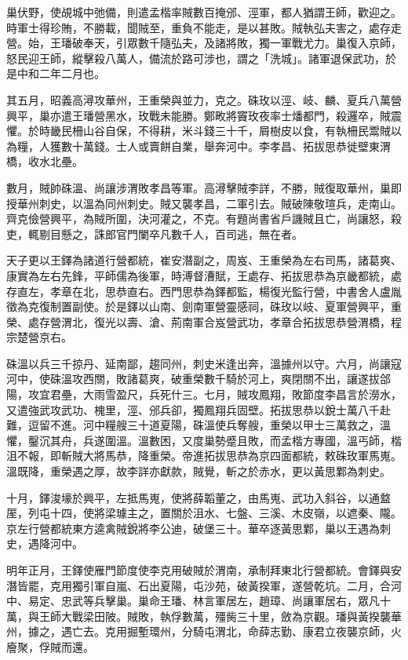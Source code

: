 \begin{pinyinscope}
 巢伏野，使覘城中弛備，則遣孟楷率賊數百掩邠、涇軍，都人猶謂王師，歡迎之。時軍士得珍賄，不勝載，聞賊至，重負不能走，是以甚敗。賊執弘夫害之，處存走營。始，王璠破奉天，引眾數千隨弘夫，及諸將敗，獨一軍戰尤力。巢復入京師，怒民迎王師，縱擊殺八萬人，備流於路可涉也，謂之「洗城」。諸軍退保武功，於是中和二年二月也。



 其五月，昭義高潯攻華州，王重榮與並力，克之。硃玫以涇、岐、麟、夏兵八萬營興平，巢亦遣王璠營黑水，玫戰未能勝。鄭畋將竇玫夜率士燔都門，殺邏卒，賊震懼。於時畿民柵山谷自保，不得耕，米斗錢三十千，屑樹皮以食，有執柵民鬻賊以為糧，人獲數十萬錢。士人或賣餅自業，舉奔河中。李孝昌、拓拔思恭徙壁東渭橋，收水北壘。



 數月，賊帥硃溫、尚讓涉渭敗孝昌等軍。高潯擊賊李詳，不勝，賊復取華州，巢即授華州刺史，以溫為同州刺史。賊又襲孝昌，二軍引去。賊破陳敬瑄兵，走南山。齊克儉營興平，為賊所圍，決河灌之，不克。有題尚書省戶譏賊且亡，尚讓怒，殺吏，輒剔目懸之，誅郎官門闌卒凡數千人，百司逃，無在者。



 天子更以王鐸為諸道行營都統，崔安潛副之，周岌、王重榮為左右司馬，諸葛爽、康實為左右先鋒，平師儒為後軍，時溥督漕賦，王處存、拓拔思恭為京畿都統，處存直左，孝章在北，思恭直右。西門思恭為鐸都監，楊復光監行營，中書舍人盧胤徵為克復制置副使。於是鐸以山南、劍南軍營靈感祠，硃玫以岐、夏軍營興平，重榮、處存營渭北，復光以壽、滄、荊南軍合岌營武功，孝章合拓拔思恭營渭橋，程宗楚營京右。



 硃溫以兵三千掠丹、延南鄙，趨同州，刺史米逢出奔，溫據州以守。六月，尚讓寇河中，使硃溫攻西關，敗諸葛爽，破重榮數千騎於河上，爽閉關不出，讓遂拔郃陽，攻宜君壘，大雨雪盈尺，兵死什三。七月，賊攻鳳翔，敗節度李昌言於澇水，又遣強武攻武功、槐里，涇、邠兵卻，獨鳳翔兵固壁。拓拔思恭以銳士萬八千赴難，逗留不進。河中糧艘三十道夏陽，硃溫使兵奪艘，重榮以甲士三萬救之，溫懼，鑿沉其舟，兵遂圍溫。溫數困，又度巢勢蹙且敗，而孟楷方專國，溫丐師，楷沮不報，即斬賊大將馬恭，降重榮。帝進拓拔思恭為京四面都統，敕硃玫軍馬嵬。溫既降，重榮遇之厚，故李詳亦獻款，賊覺，斬之於赤水，更以黃思鄴為刺史。



 十月，鐸浚壕於興平，左抵馬嵬，使將薛韜董之，由馬嵬、武功入斜谷，以通盩厔，列屯十四，使將梁璩主之，置關於沮水、七盤、三溪、木皮嶺，以遮秦、隴。京左行營都統東方逵禽賊銳將李公迪，破堡三十。華卒逐黃思鄴，巢以王遇為刺史，遇降河中。



 明年正月，王鐸使雁門節度使李克用破賊於渭南，承制拜東北行營都統。會鐸與安潛皆罷，克用獨引軍自嵐、石出夏陽，屯沙苑，破黃揆軍，遂營乾坑。二月，合河中、易定、忠武等兵擊巢。巢命王璠、林言軍居左，趙璋、尚讓軍居右，眾凡十萬，與王師大戰梁田陂。賊敗，執俘數萬，殭胔三十里，斂為京觀。璠與黃揆襲華州，據之，遇亡去。克用掘塹環州，分騎屯渭北，命薛志勤、康君立夜襲京師，火廥聚，俘賊而還。




\end{pinyinscope}
